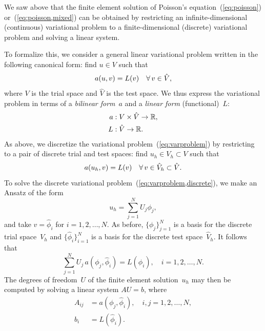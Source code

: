 We saw above that the finite element solution of Poisson's
equation~(\ref{eq:poisson}) or~(\ref{eq:poisson,mixed}) can be
obtained by restricting an infinite-dimensional (continuous) variational problem to
a finite-dimensional (discrete) variational problem and solving a linear system.

To formalize this, we consider a general linear variational problem
written in the following canonical form: find $u \in V$ such that
\begin{equation} \label{eq:varproblem}
  a(u, v) = L(v) \quad \forall\, v \in \hat{V},
\end{equation}
where $V$ is the trial space and $\hat{V}$ is the test space. We thus
express the variational problem in terms of a \emph{bilinear form}~$a$
and a \emph{linear form} (functional)~$L$:
\begin{equation}
  \begin{split}
    a &: V \times \hat{V} \rightarrow \mathbb{R},
    \\
    L &: \hat{V} \rightarrow \mathbb{R}.
  \end{split}
\end{equation}
As above, we discretize the variational problem~(\ref{eq:varproblem})
by restricting to a pair of discrete trial and test spaces: find $u_h
\in V_h \subset V$ such that
\begin{equation} \label{eq:varproblem,discrete}
  a(u_h, v) = L(v) \quad \forall\, v \in \hat{V}_h \subset \hat{V}.
\end{equation}
To solve the discrete variational
problem~(\ref{eq:varproblem,discrete}), we make an Ansatz of the form
\begin{equation} \label{eq:ansatz}
  u_h = \sum_{j=1}^N U_j \phi_j,
\end{equation}
and take $v = \hat{\phi}_i$ for $i = 1,2,\ldots,N$. As before,
$\{\phi_j\}_{j=1}^N$ is a basis for the discrete trial space~$V_h$ and
$\{\hat{\phi}_i\}_{i=1}^N$ is a basis for the discrete test
space~$\hat{V}_h$. It follows that
\begin{equation}
  \sum_{j=1}^N U_j \, a(\phi_j, \hat{\phi}_i) = L(\hat{\phi}_i), \quad i
  = 1,2,\ldots,N.
\end{equation}
The degrees of freedom~$U$ of the finite element solution~$u_h$ may
then be computed by solving a linear system $AU = b$, where
\begin{equation} \label{eq:system}
  \begin{split}
    A_{ij} &= a(\phi_j, \hat{\phi}_i), \quad i, j = 1,2,\ldots,N, \\
    b_i &= L(\hat{\phi}_i).
  \end{split}
\end{equation}

